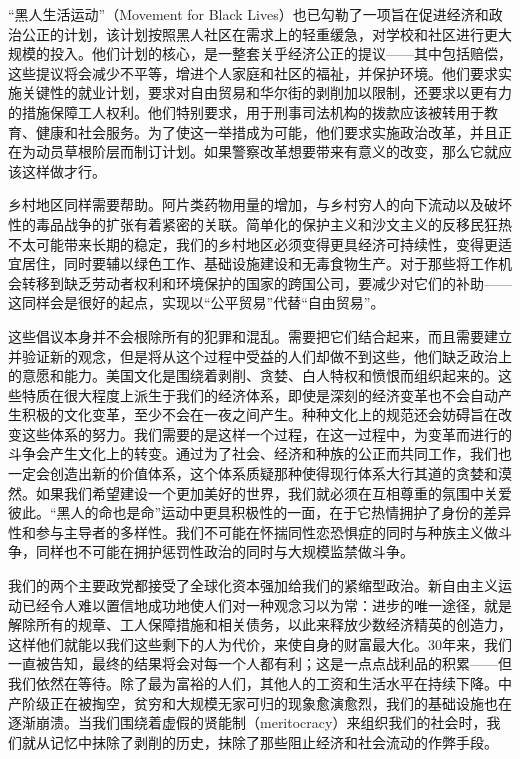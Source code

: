 \documentclass[fontset=fandol, a4paper, 12pt, openright]{ctexbook}
\begin{document}
“黑人生活运动”（Movement for Black Lives）也已勾勒了一项旨在促进经济和政治公正的计划，该计划按照黑人社区在需求上的轻重缓急，对学校和社区进行更大规模的投入。他们计划的核心，是一整套关乎经济公正的提议——其中包括赔偿，这些提议将会减少不平等，增进个人家庭和社区的福祉，并保护环境。他们要求实施关键性的就业计划，要求对自由贸易和华尔街的剥削加以限制，还要求以更有力的措施保障工人权利。他们特别要求，用于刑事司法机构的拨款应该被转用于教育、健康和社会服务。为了使这一举措成为可能，他们要求实施政治改革，并且正在为动员草根阶层而制订计划。如果警察改革想要带来有意义的改变，那么它就应该这样做才行。

乡村地区同样需要帮助。阿片类药物用量的增加，与乡村穷人的向下流动以及破坏性的毒品战争的扩张有着紧密的关联。简单化的保护主义和沙文主义的反移民狂热不太可能带来长期的稳定，我们的乡村地区必须变得更具经济可持续性，变得更适宜居住，同时要辅以绿色工作、基础设施建设和无毒食物生产。对于那些将工作机会转移到缺乏劳动者权利和环境保护的国家的跨国公司，要减少对它们的补助——这同样会是很好的起点，实现以“公平贸易”代替“自由贸易”。

这些倡议本身并不会根除所有的犯罪和混乱。需要把它们结合起来，而且需要建立并验证新的观念，但是将从这个过程中受益的人们却做不到这些，他们缺乏政治上的意愿和能力。美国文化是围绕着剥削、贪婪、白人特权和愤恨而组织起来的。这些特质在很大程度上派生于我们的经济体系，即使是深刻的经济变革也不会自动产生积极的文化变革，至少不会在一夜之间产生。种种文化上的规范还会妨碍旨在改变这些体系的努力。我们需要的是这样一个过程，在这一过程中，为变革而进行的斗争会产生文化上的转变。通过为了社会、经济和种族的公正而共同工作，我们也一定会创造出新的价值体系，这个体系质疑那种使得现行体系大行其道的贪婪和漠然。如果我们希望建设一个更加美好的世界，我们就必须在互相尊重的氛围中关爱彼此。“黑人的命也是命”运动中更具积极性的一面，在于它热情拥护了身份的差异性和参与主导者的多样性。我们不可能在怀揣同性恋恐惧症的同时与种族主义做斗争，同样也不可能在拥护惩罚性政治的同时与大规模监禁做斗争。

我们的两个主要政党都接受了全球化资本强加给我们的紧缩型政治。新自由主义运动已经令人难以置信地成功地使人们对一种观念习以为常：进步的唯一途径，就是解除所有的规章、工人保障措施和相关债务，以此来释放少数经济精英的创造力，这样他们就能以我们这些剩下的人为代价，来使自身的财富最大化。30年来，我们一直被告知，最终的结果将会对每一个人都有利；这是一点点战利品的积累——但我们依然在等待。除了最为富裕的人们，其他人的工资和生活水平在持续下降。中产阶级正在被掏空，贫穷和大规模无家可归的现象愈演愈烈，我们的基础设施也在逐渐崩溃。当我们围绕着虚假的贤能制（meritocracy）来组织我们的社会时，我们就从记忆中抹除了剥削的历史，抹除了那些阻止经济和社会流动的作弊手段。
\end{document}

